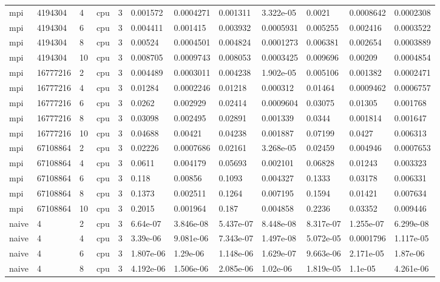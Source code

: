 \begin{tabular}{llllllllllll}
mpi & 4194304 & 4 & cpu & 3 & 0.001572 & 0.0004271 & 0.001311 & 3.322e-05 & 0.0021 & 0.0008642 & 0.0002308 \\
mpi & 4194304 & 6 & cpu & 3 & 0.004411 & 0.001415 & 0.003932 & 0.0005931 & 0.005255 & 0.002416 & 0.0003522 \\
mpi & 4194304 & 8 & cpu & 3 & 0.00524 & 0.0004501 & 0.004824 & 0.0001273 & 0.006381 & 0.002654 & 0.0003889 \\
mpi & 4194304 & 10 & cpu & 3 & 0.008705 & 0.0009743 & 0.008053 & 0.0003425 & 0.009696 & 0.00209 & 0.0004854 \\
mpi & 16777216 & 2 & cpu & 3 & 0.004489 & 0.0003011 & 0.004238 & 1.902e-05 & 0.005106 & 0.001382 & 0.0002471 \\
mpi & 16777216 & 4 & cpu & 3 & 0.01284 & 0.0002246 & 0.01218 & 0.000312 & 0.01464 & 0.0009462 & 0.0006757 \\
mpi & 16777216 & 6 & cpu & 3 & 0.0262 & 0.002929 & 0.02414 & 0.0009604 & 0.03075 & 0.01305 & 0.001768 \\
mpi & 16777216 & 8 & cpu & 3 & 0.03098 & 0.002495 & 0.02891 & 0.001339 & 0.0344 & 0.001814 & 0.001647 \\
mpi & 16777216 & 10 & cpu & 3 & 0.04688 & 0.00421 & 0.04238 & 0.001887 & 0.07199 & 0.0427 & 0.006313 \\
mpi & 67108864 & 2 & cpu & 3 & 0.02226 & 0.0007686 & 0.02161 & 3.268e-05 & 0.02459 & 0.004946 & 0.0007653 \\
mpi & 67108864 & 4 & cpu & 3 & 0.0611 & 0.004179 & 0.05693 & 0.002101 & 0.06828 & 0.01243 & 0.003323 \\
mpi & 67108864 & 6 & cpu & 3 & 0.118 & 0.00856 & 0.1093 & 0.004327 & 0.1333 & 0.03178 & 0.006331 \\
mpi & 67108864 & 8 & cpu & 3 & 0.1373 & 0.002511 & 0.1264 & 0.007195 & 0.1594 & 0.01421 & 0.007634 \\
mpi & 67108864 & 10 & cpu & 3 & 0.2015 & 0.001964 & 0.187 & 0.004858 & 0.2236 & 0.03352 & 0.009446 \\
naive & 4 & 2 & cpu & 3 & 6.64e-07 & 3.846e-08 & 5.437e-07 & 8.448e-08 & 8.317e-07 & 1.255e-07 & 6.299e-08 \\
naive & 4 & 4 & cpu & 3 & 3.39e-06 & 9.081e-06 & 7.343e-07 & 1.497e-08 & 5.072e-05 & 0.0001796 & 1.117e-05 \\
naive & 4 & 6 & cpu & 3 & 1.807e-06 & 1.29e-06 & 1.148e-06 & 1.629e-07 & 9.663e-06 & 2.171e-05 & 1.87e-06 \\
naive & 4 & 8 & cpu & 3 & 4.192e-06 & 1.506e-06 & 2.085e-06 & 1.02e-06 & 1.819e-05 & 1.1e-05 & 4.261e-06 \\

\end{tabular}
